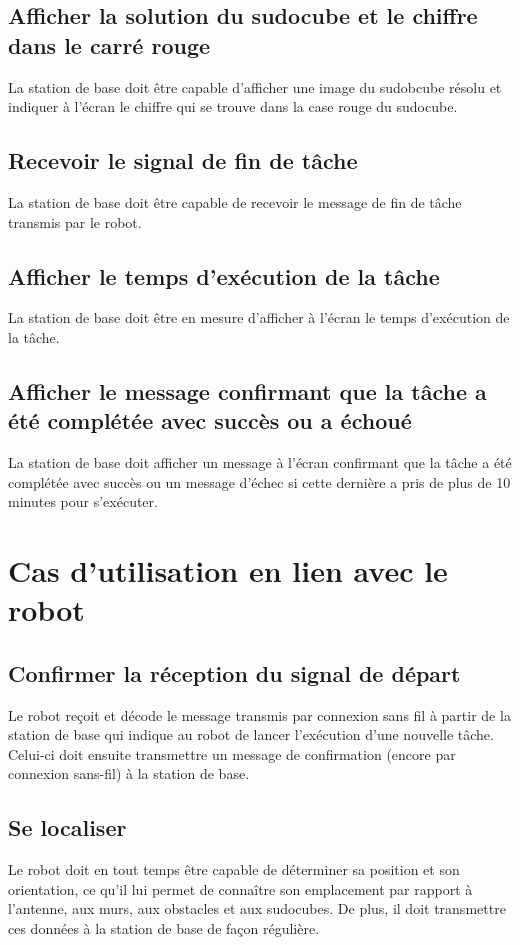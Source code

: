 \subsection{Afficher la solution du sudocube et le chiffre dans le carré rouge}
La station de base doit être capable d'afficher une image du sudobcube résolu et indiquer à l'écran le chiffre qui se trouve dans la case rouge du sudocube.
\subsection{Recevoir le signal de fin de tâche}
La station de base doit être capable de recevoir le message de fin de tâche transmis par le robot.
\subsection{Afficher le temps d'exécution de la tâche}
La station de base doit être en mesure d'afficher à l'écran le temps d'exécution de la tâche.
\subsection{Afficher le message confirmant que la tâche a été complétée avec succès ou a échoué}
La station de base doit afficher un message à l'écran confirmant que la tâche a été complétée avec succès ou un message d'échec si cette dernière a pris de plus de 10 minutes pour s'exécuter.
\section{Cas d'utilisation en lien avec le robot}
\subsection{Confirmer la réception du signal de départ}
Le robot reçoit et décode le message transmis par connexion sans fil à partir de la station de base qui indique au robot de lancer l'exécution d'une nouvelle tâche. Celui-ci doit ensuite transmettre un message de confirmation (encore par connexion sans-fil) à la station de base.
\subsection{Se localiser}
Le robot doit en tout temps être capable de déterminer sa position et son orientation, ce qu'il lui permet de connaître son emplacement par rapport à l'antenne, aux murs, aux obstacles et aux sudocubes. De plus, il doit transmettre ces données à la station de base de façon régulière.
